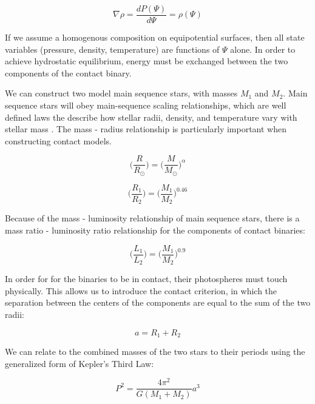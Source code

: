 \documentclass[12pt]{article} %
\numberwithin{equation}{section} %
\begin{document}
\begin{equation} \label{eqn: equilibrium2}
\nabla \rho = \frac{dP(\Psi)}{d\Psi} = \rho(\Psi)
\end{equation}

If we assume a homogenous composition on equipotential surfaces, then all state variables (pressure, density, temperature) are functions of $\Psi$ alone. In order to achieve hydrostatic equilibrium, energy must be exchanged between the two components of the contact binary.

We can construct two model main sequence stars, with masses $M_{1}$ and $M_{2}$. Main sequence stars will obey main-sequence scaling relationships, which are well defined laws the describe how stellar radii, density, and temperature vary with stellar mass \citep{kippenhahn1990stellar}. The mass - radius relationship is particularly important when constructing contact models. 

\begin{equation} \label{eqn: mass_radius}
 \bigg( \frac{R}{R_{\odot}} \bigg) = \bigg( \frac{M}{M_{\odot}} \bigg)^{\alpha}
\end{equation}

\begin{equation} \label{eqn: roche_mass_radius}
\bigg( \frac{R_{1}}{R_{2}} \bigg) = \bigg( \frac{M_{1}}{M_{2}} \bigg)^{0.46}
\end{equation}

Because of the mass - luminosity relationship of main sequence stars, there is a mass ratio - luminosity ratio relationship for the components of contact binaries: 

\begin{equation} \label{eqn: luminosity_radius}
\bigg( \frac{L_{1}}{L_{2}} \bigg) = \bigg( \frac{M_{1}}{M_{2}} \bigg)^{0.9}
\end{equation}


In order for for the binaries to be in contact, their photospheres must touch physically. This allows us to introduce the contact criterion, in which the separation between the centers of the components are equal to the sum of the two radii:

\begin{equation} \label{eqn: contact_criterion}
a = R_{1} + R_{2}
\end{equation}

We can relate to the combined masses of the two stars to their periods using the generalized form of Kepler's Third Law: 

\begin{equation} \label{eqn: kepler3}
P^{2} = \frac{4\pi^{2}}{G(M_{1} + M_{2})} a^{3}
\end{equation}
\end{document}
